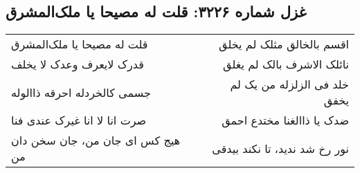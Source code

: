 \begin{center}
\section*{غزل شماره ۳۲۲۶: قلت له مصیحا یا ملک‌المشرق}
\label{sec:3226}
\begin{longtable}{l p{0.5cm} r}
قلت له مصیحا یا ملک‌المشرق
&&
اقسم بالخالق مثلک لم یخلق
\\
قدرک لایعرف وعدک لا یخلف
&&
نائلک الاشرف بالک لم یغلق
\\
جسمی کالخردله احرقه ذاالوله
&&
خلد فی الزلزله من یک لم یخفق
\\
صرت انا لا انا غیرک عندی فنا
&&
ضدک یا ذاالغنا مختدع احمق
\\
هیج کس ای جان من، جان سخن دان من
&&
نور رخ شد ندید، تا نکند بیدقی
\\
\end{longtable}
\end{center}
